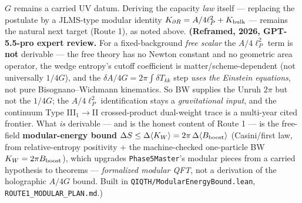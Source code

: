 \documentclass[11pt,a4paper]{article}
\begin{document}
$G$ remains a carried UV datum. Deriving the capacity \emph{law} itself — replacing the postulate by a JLMS-type modular identity $K_{\partial R} = A/4\ell_P^2 + K_{\rm bulk}$ — remains the natural next target (Route 1), as noted above. \textbf{(Reframed, 2026, GPT-5.5-pro expert review.} For a fixed-background \emph{free scalar} the $A/4\ell_P^2$ term is \textbf{not} derivable — the free theory has no Newton constant and no geometric area operator, the wedge entropy's cutoff coefficient is matter/scheme-dependent (not universally $1/4G$), and the $\delta A/4G = 2\pi\!\int\!\delta T_{kk}$ step \emph{uses the Einstein equations}, not pure Bisognano–Wichmann kinematics. So BW supplies the Unruh $2\pi$ but not the $1/4G$; the $A/4\ell_P^2$ identification stays a \emph{gravitational input}, and the continuum Type III$_1\!\to$II crossed-product dual-weight trace is a multi-year cited frontier. What \emph{is} derivable — and is the honest content of Route 1 — is the free-field \textbf{modular-energy bound} $\Delta S \le \Delta\langle K_W\rangle = 2\pi\,\Delta\langle B_{\rm boost}\rangle$ (Casini/first law, from relative-entropy positivity + the machine-checked one-particle BW $K_W = 2\pi B_{\rm boost}$), which upgrades \texttt{Phase5Master}'s modular pieces from a carried hypothesis to theorems — \emph{formalized modular QFT}, not a derivation of the holographic $A/4G$ bound. Built in \texttt{QIQTH/ModularEnergyBound.lean}, \texttt{ROUTE1\_MODULAR\_PLAN.md}.)
\end{document}
